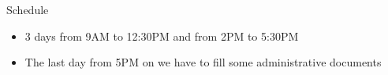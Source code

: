 \begin{frame}{Schedule}
  \begin{itemize}
  \item 3 days from 9AM to 12:30PM and from 2PM to 5:30PM
  \item The last day from 5PM on we have to fill some administrative documents
  \end{itemize}
\end{frame}

